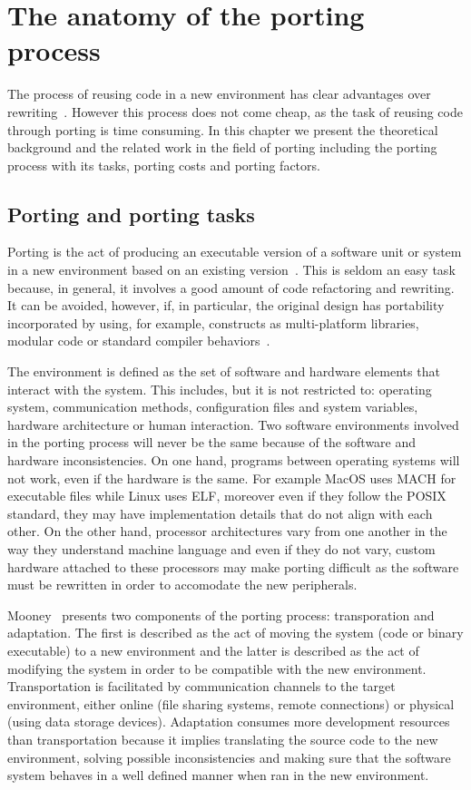 \chapter{The anatomy of the porting process} \label{sec:background}

The process of reusing code in a new environment has clear advantages over
rewriting~\cite{frakes1995sixteen}. However this process does not come cheap, as
the task of reusing code through porting is time consuming. In this chapter we
present the theoretical background and the related work in the field of porting
including the porting process with its tasks, porting costs and porting factors.

\section{Porting and porting tasks}

Porting is the act of producing an executable version of a software unit or
system in a new environment based on an existing
version~\cite{mooney1990strategies}. This is seldom an easy task because, in
general, it involves a good amount of code refactoring and rewriting. It can be
avoided, however, if, in particular, the original design has portability
incorporated by using, for example, constructs as multi-platform libraries,
modular code or standard compiler behaviors~\cite{tanenbaum1978guidelines}.

The environment is defined as the set of software and hardware elements that
interact with the system. This includes, but it is not restricted to: operating
system, communication methods, configuration files and system variables,
hardware architecture or human interaction. Two software environments involved
in the porting process will never be the same because of the software and
hardware inconsistencies. On one hand, programs between operating systems will
not work, even if the hardware is the same. For example MacOS uses MACH for
executable files while Linux uses ELF, moreover even if they follow the POSIX
standard, they may have implementation details that do not align with each
other. On the other hand, processor architectures vary from one another in the
way they understand machine language and even if they do not vary, custom
hardware attached to these processors may make porting difficult as the software
must be rewritten in order to accomodate the new peripherals.

Mooney~\cite{mooney1990strategies} presents two components of the porting process:
transporation and adaptation. The first is described as the act of moving the
system (code or binary executable) to a new environment and the latter is
described as the act of modifying the system in order to be compatible with the
new environment. Transportation is facilitated by communication channels to the
target environment, either online (file sharing systems, remote connections) or
physical (using data storage devices). Adaptation consumes more development
resources than transportation because it implies translating the source code to
the new environment, solving possible inconsistencies and making sure that the
software system behaves in a well defined manner when ran in the new
environment.

